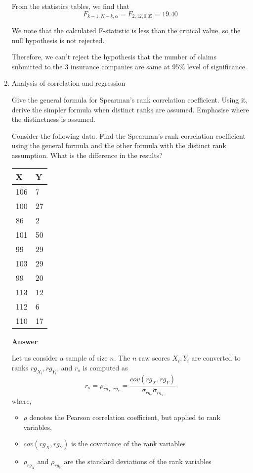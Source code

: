 \documentclass[12pt, oneside]{article}
\begin{document}
\begin{enumerate}
{    From the statistics tables, we find that
    \[F_{k-1,N-k,\alpha} = F_{2,12,0.05} = 19.40\]

    We note that the calculated F-statistic is less than the critical value, so
    the null hypothesis is not rejected.

    Therefore, we can't reject the hypothesis that the number of claims submitted to
    the 3 insurance companies are same at 95\% level of significance.
}

\item {
    Analysis of correlation and regression 

    Give the general formula for Spearman's rank correlation coefficient. Using it,
    derive the simpler formula when distinct ranks are assumed. Emphasise where the
    distinctness is assumed.

    Consider the following data. Find the Spearman's rank correlation coefficient
    using the general formula and the other formula with the distinct rank assumption.
    What is the difference in the results?

    \begin{center}
    \begin{tabular}{ | l | l | }
        \hline
        \textbf{X} & \textbf{Y} \\
        \hline
        106 &	7 \\
        100 &  	27 \\
        86 & 2 \\
        101 &	50 \\
        99 &	29 \\
        103 &	29 \\
        99 &	20 \\
        113 &	12 \\
        112 &	6 \\
        110 &	17 \\
        \hline
    \end{tabular}
    \end{center}

    \textbf{Answer}

    Let us consider a sample of size \(n\). The \(n\) raw scores \(X_i, Y_i\) are
    converted to ranks \(rg_{X_i}, rg_{Y_i}\), and \(r_s\) is computed as
    \begin{equation}
        r_s = \rho_{rg_X, rg_Y} = \frac{cov(rg_X, rg_Y)}{\sigma_{rg_x}\sigma_{rg_Y}}
            \label{eq:q3:spearman_general_formula}
    \end{equation}
    where,
    \begin{itemize}
        \item \(\rho\) denotes the Pearson correlation coefficient, but applied to 
            rank variables,
        \item \(cov(rg_X, rg_Y)\) is the covariance of the rank variables
        \item \(\rho_{rg_X}\) and \(\rho_{rg_Y}\) are the standard deviations of the rank variables
    \end{itemize}

}
\end{enumerate}
\end{document}
